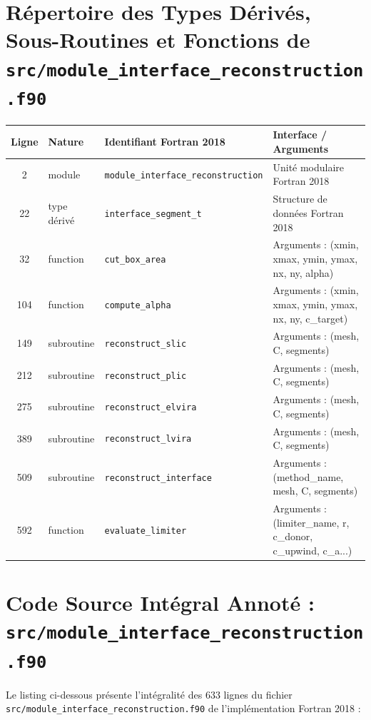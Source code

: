 \documentclass[10pt,a4paper,oneside]{book}
\begin{document}
\section{Répertoire des Types Dérivés, Sous-Routines et Fonctions de \texttt{src/module\_interface\_reconstruction.f90}}
\begin{center}\small
\begin{tabular}{clll}
\toprule
\textbf{Ligne} & \textbf{Nature} & \textbf{Identifiant Fortran 2018} & \textbf{Interface / Arguments} \\
\midrule
2 & module & \texttt{module\_interface\_reconstruction} & Unité modulaire Fortran 2018 \\
22 & type dérivé & \texttt{interface\_segment\_t} & Structure de données Fortran 2018 \\
32 & function & \texttt{cut\_box\_area} & Arguments : (xmin, xmax, ymin, ymax, nx, ny, alpha) \\
104 & function & \texttt{compute\_alpha} & Arguments : (xmin, xmax, ymin, ymax, nx, ny, c\_target) \\
149 & subroutine & \texttt{reconstruct\_slic} & Arguments : (mesh, C, segments) \\
212 & subroutine & \texttt{reconstruct\_plic} & Arguments : (mesh, C, segments) \\
275 & subroutine & \texttt{reconstruct\_elvira} & Arguments : (mesh, C, segments) \\
389 & subroutine & \texttt{reconstruct\_lvira} & Arguments : (mesh, C, segments) \\
509 & subroutine & \texttt{reconstruct\_interface} & Arguments : (method\_name, mesh, C, segments) \\
592 & function & \texttt{evaluate\_limiter} & Arguments : (limiter\_name, r, c\_donor, c\_upwind, c\_a...) \\
\bottomrule
\end{tabular}
\end{center}

\section{Code Source Intégral Annoté : \texttt{src/module\_interface\_reconstruction.f90}}
Le listing ci-dessous présente l'intégralité des 633 lignes du fichier \texttt{src/module\_interface\_reconstruction.f90} de l'implémentation Fortran 2018 :
\end{document}
